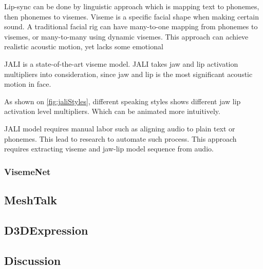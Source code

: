 \documentclass[10pt,twocolumn,letterpaper]{article}
\begin{document}
Lip-sync can be done by linguistic approach which is mapping text to phonemes, then phonemes to visemes\cite{ezzatMikeTalkTalkingFacial1998}. Viseme is a specific facial shape when making certain sound. A traditional facial rig can have many-to-one mapping from phonemes to visemes, or many-to-many using dynamic visemes. This approach can achieve realistic acoustic motion, yet lacks some emotional 

JALI\cite{edwardsJALIAnimatorcentricViseme2016} is a state-of-the-art viseme model. JALI takes jaw and lip activation multipliers into consideration, since jaw and lip is the most significant acoustic motion in face.

As shown on \cref{fig:jaliStyles}, different speaking styles shows different jaw lip activation level multipliers. Which can be animated more intuitively.

JALI model requires manual labor such as aligning audio to plain text or phonemes. This lead to research to automate such process. This approach requires extracting viseme and jaw-lip model sequence from audio. 



\subsubsection{VisemeNet}



\subsection{MeshTalk}

\subsection{D3DExpression}

\subsection{Discussion}

{\small



}
\end{document}
